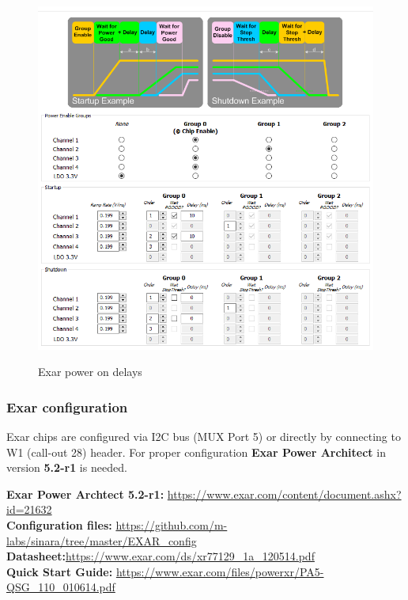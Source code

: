 	\begin{figure}[htbp!]
		\centering
		\includegraphics[scale=0.6]{img/exar2.png}\\
		\caption{Exar power on delays} 
	\end{figure}	
	
\clearpage	


\subsubsection{Exar configuration}
Exar chips are configured via I2C bus (MUX Port 5) or directly by connecting to W1 (call-out 28) header. For proper configuration \textbf{Exar Power Architect} in version \textbf{5.2-r1} is needed.

\noindent
\textbf{Exar Power Archtect 5.2-r1:}
\href{https://www.exar.com/content/document.ashx?id=21632}{https://www.exar.com/content/document.ashx?id=21632}\\
\textbf{Configuration files:}
\href{https://github.com/m-labs/sinara/tree/master/EXAR\_config}{https://github.com/m-labs/sinara/tree/master/EXAR\_config}\\
\textbf{Datasheet:}\href{https://www.exar.com/ds/xr77129_1a_120514.pdf}{https://www.exar.com/ds/xr77129\_1a\_120514.pdf}\\
\textbf{Quick Start Guide:} \href{https://www.exar.com/files/powerxr/PA5-QSG_110_010614.pdf}{https://www.exar.com/files/powerxr/PA5-QSG\_110\_010614.pdf}\\


